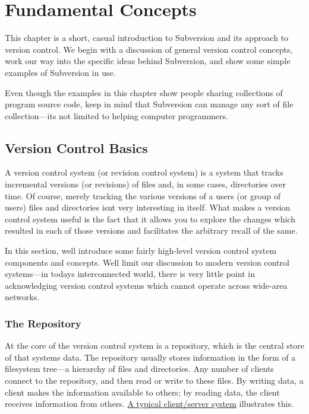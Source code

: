 \chapter{Fundamental Concepts}\label{svn.basic}

This chapter is a short, casual introduction to Subversion and its
approach to version control. We begin with a discussion of general
version control concepts, work our way into the specific ideas behind
Subversion, and show some simple examples of Subversion in use.

Even though the examples in this chapter show people sharing collections
of program source code, keep in mind that Subversion can manage any sort
of file collection---it\textquotesingle s not limited to helping
computer programmers.

\section{Version Control Basics}\label{svn.basic.version-control-basics}

A version control system (or revision control system) is a system that
tracks incremental versions (or revisions) of files and, in some cases,
directories over time. Of course, merely tracking the various versions
of a user\textquotesingle s (or group of users\textquotesingle) files
and directories isn\textquotesingle t very interesting in itself. What
makes a version control system useful is the fact that it allows you to
explore the changes which resulted in each of those versions and
facilitates the arbitrary recall of the same.

In this section, we\textquotesingle ll introduce some fairly high-level
version control system components and concepts. We\textquotesingle ll
limit our discussion to modern version control systems---in
today\textquotesingle s interconnected world, there is very little point
in acknowledging version control systems which cannot operate across
wide-area networks.

\subsection{The Repository}\label{svn.basic.repository}

At the core of the version control system is a repository, which is the
central store of that system\textquotesingle s data. The repository
usually stores information in the form of a filesystem tree---a
hierarchy of files and directories. Any number of clients connect to the
repository, and then read or write to these files. By writing data, a
client makes the information available to others; by reading data, the
client receives information from others.
\hyperref[svn.basic.repository.dia-1]{A typical client/server system}
illustrates this.

